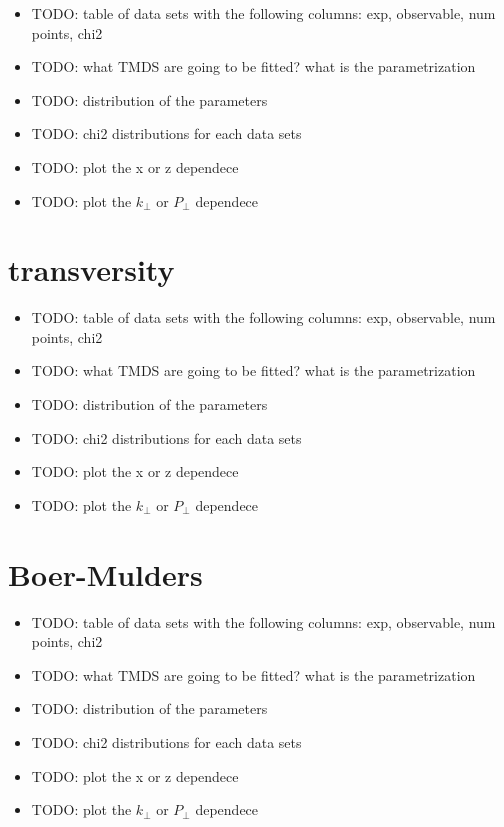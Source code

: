 \documentclass[floatfix,aps,prd,nofootinbib,superscriptaddress,preprint]{revtex4}
\newcommand\3[1]{\boldsymbol{#1}}
\begin{document}
\begin{itemize}
\item {\color{red} TODO: table of data sets with the following columns: exp, observable, num points, chi2 }
\item {\color{red} TODO: what TMDS are going to be fitted? what is the parametrization}
\item {\color{red} TODO: distribution of the parameters}
\item {\color{red} TODO: chi2 distributions for each data sets}
\item {\color{red} TODO: plot the x or z dependece}
\item {\color{red} TODO: plot the $k_{\perp}$ or $P_{\perp}$ dependece}
\end{itemize}

\newpage
\section{transversity}

\begin{itemize}
\item {\color{red} TODO: table of data sets with the following columns: exp, observable, num points, chi2 }
\item {\color{red} TODO: what TMDS are going to be fitted? what is the parametrization}
\item {\color{red} TODO: distribution of the parameters}
\item {\color{red} TODO: chi2 distributions for each data sets}
\item {\color{red} TODO: plot the x or z dependece}
\item {\color{red} TODO: plot the $k_{\perp}$ or $P_{\perp}$ dependece}
\end{itemize}

\newpage
\section{Boer-Mulders}

\begin{itemize}
\item {\color{red} TODO: table of data sets with the following columns: exp, observable, num points, chi2 }
\item {\color{red} TODO: what TMDS are going to be fitted? what is the parametrization}
\item {\color{red} TODO: distribution of the parameters}
\item {\color{red} TODO: chi2 distributions for each data sets}
\item {\color{red} TODO: plot the x or z dependece}
\item {\color{red} TODO: plot the $k_{\perp}$ or $P_{\perp}$ dependece}
\end{itemize}
\end{document}
